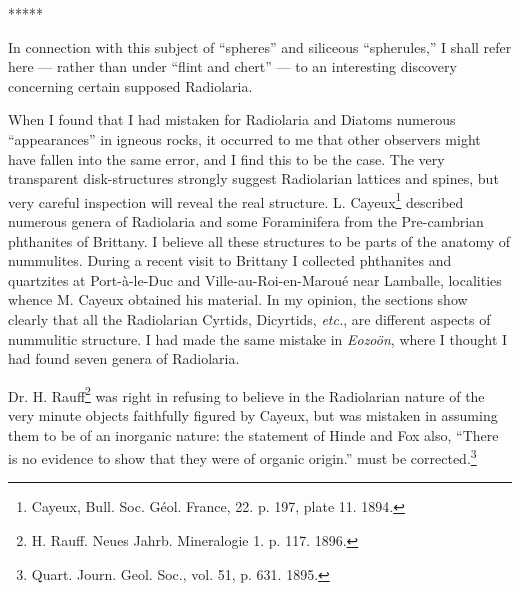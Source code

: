 \documentclass[a4paper, 12pt, oneside]{article}
\begin{document}
\centerline{*\hspace{15mm}*\hspace{15mm}*\hspace{15mm}*\hspace{15mm}*}
\bigskip

In connection with this subject of ``spheres'' and siliceous ``spherules,'' I shall refer here --- rather than under ``flint and chert'' --- to an interesting discovery concerning certain supposed Radiolaria.

When I found that I had mistaken for Radiolaria and Diatoms numerous ``appearances'' in igneous rocks, it occurred to me that other observers might have fallen into the same error, and I find this to be the case. The very transparent disk-structures strongly suggest Radiolarian lattices and spines, but very careful inspection will reveal the real structure. L. Cayeux\footnote{Cayeux, Bull. Soc. Géol. France, 22. p. 197, plate 11. 1894.} described numerous genera of Radiolaria and some Foraminifera from the Pre-cambrian phthanites of Brittany. I believe all these structures to be parts of the anatomy of nummulites. During a recent visit to Brittany I collected phthanites and quartzites at Port-à-le-Duc and Ville-au-Roi-en-Maroué near Lamballe, localities whence M. Cayeux obtained his material. In my opinion, the sections show clearly that all the Radiolarian Cyrtids, Dicyrtids, \emph{etc.}, are different aspects of nummulitic structure. I had made the same mistake in \emph{Eozoön}, where I thought I had found seven genera of Radiolaria.

Dr. H. Rauff\footnote{H. Rauff. Neues Jahrb. Mineralogie 1. p. 117. 1896.} was right in refusing to believe in the Radiolarian nature of the very minute objects faithfully figured by Cayeux, but was mistaken in assuming them to be of an inorganic nature: the statement of Hinde and Fox also, ``There is no evidence to show that they were of organic origin.'' must be corrected.\footnote{Quart. Journ. Geol. Soc., vol. 51, p. 631. 1895.}
\end{document}
